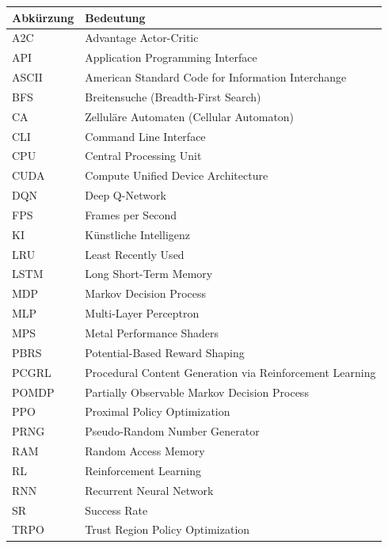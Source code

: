 \documentclass[
  a4paper,
  11pt,
  twoside,
  BCOR=8mm,           %
  headings=big,
  numbers=noenddot,
  listof=totoc,       %
  captions=tableheading,
]{scrreprt}
\begin{document}
\begin{longtable}{@{}p{3.2cm}p{10.5cm}@{}}
\toprule
\textbf{Abkürzung} & \textbf{Bedeutung}\\
\midrule
\endhead
A2C & Advantage Actor-Critic\\
API & Application Programming Interface\\
ASCII & American Standard Code for Information Interchange\\
BFS & Breitensuche (Breadth-First Search)\\
CA & Zelluläre Automaten (Cellular Automaton)\\
CLI & Command Line Interface\\
CPU & Central Processing Unit\\
CUDA & Compute Unified Device Architecture\\
DQN & Deep Q-Network\\
FPS & Frames per Second\\
KI & Künstliche Intelligenz\\
LRU & Least Recently Used\\
LSTM & Long Short-Term Memory\\
MDP & Markov Decision Process\\
MLP & Multi-Layer Perceptron\\
MPS & Metal Performance Shaders\\
PBRS & Potential-Based Reward Shaping\\
PCGRL & Procedural Content Generation via Reinforcement Learning\\
POMDP & Partially Observable Markov Decision Process\\
PPO & Proximal Policy Optimization\\
PRNG & Pseudo-Random Number Generator\\
RAM & Random Access Memory\\
RL & Reinforcement Learning\\
RNN & Recurrent Neural Network\\
SR & Success Rate\\
TRPO & Trust Region Policy Optimization\\
\bottomrule
\end{longtable}

\clearpage


\clearpage
{}

\end{document}
